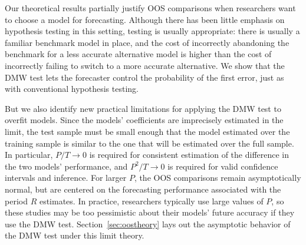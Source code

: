 \documentclass[12pt,draft]{article}
\begin{document}
Our theoretical results partially justify OOS comparisons when
researchers want to
choose a model for forecasting.  Although there has been little
emphasis on hypothesis testing in this setting, testing is usually
appropriate: there is usually a familiar benchmark model in place, and
the cost of incorrectly abandoning the benchmark for a less accurate
alternative model is higher than the cost of incorrectly failing to
switch to a more accurate alternative.  We show that the DMW test
lets the forecaster control the probability of the first error, just
as with conventional hypothesis testing.

But we also identify new practical limitations for applying the DMW
test to overfit models.
Since the models' coefficients are imprecisely estimated in the limit,
the test sample must be small enough that the model estimated over the
training sample is similar to the one that will be estimated over the
full sample.  In particular, $P/T \to 0$ is required for consistent
estimation of the difference in the two models' performance,
and $P^2/T \to 0$ is required for valid confidence
intervals and inference.  For larger $P$, the OOS comparisons remain
asymptotically normal, but are centered on the forecasting performance
associated with the period $R$ estimates.  In practice, researchers
typically use large values of $P$, so these studies may be too
pessimistic about their models' future accuracy if they use the DMW
test.  Section~\ref{sec:oostheory} lays out the asymptotic behavior of
the DMW test under this limit theory.
\end{document}
